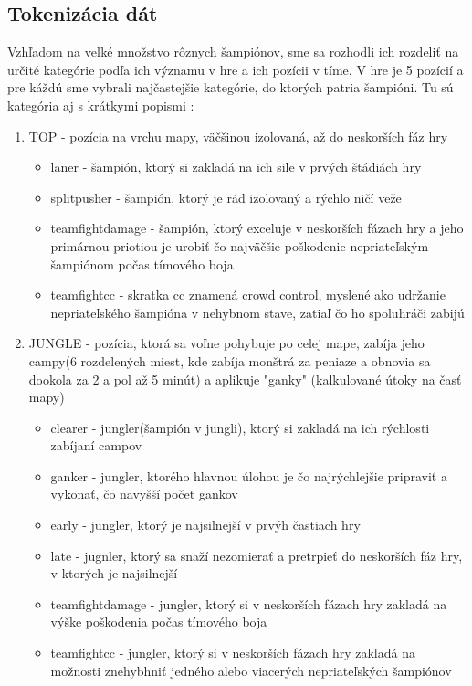 \subsection{Tokenizácia dát}
Vzhľadom na veľké množstvo rôznych šampiónov, sme sa rozhodli ich rozdeliť na určité kategórie podľa ich významu v hre a ich pozícii v tíme.
V hre je 5 pozícií a pre káždú sme vybrali najčastejšie kategórie, do ktorých patria šampióni. Tu sú kategória aj s krátkymi popismi :
\begin{enumerate}
	\item TOP - pozícia na vrchu mapy, väčšinou izolovaná, až do neskorších fáz hry
	 \begin{itemize}
		\item laner - šampión, ktorý si zakladá na ich sile v prvých štádiách hry
		\item splitpusher - šampión, ktorý je rád izolovaný a rýchlo ničí veže
		\item teamfightdamage - šampión, ktorý exceluje v neskorších fázach hry a jeho primárnou priotiou je urobiť čo najväčšie poškodenie nepriateľským šampiónom počas tímového boja
		\item teamfightcc - skratka cc znamená crowd control, myslené ako udržanie nepriateľského šampióna v nehybnom stave, zatiaľ čo ho spoluhráči zabijú
	\end{itemize}
	\item JUNGLE - pozícia, ktorá sa voľne pohybuje po celej mape, zabíja jeho campy(6 rozdelených miest, kde zabíja monštrá za peniaze a obnovia sa dookola za 2 a pol až 5 minút)  a aplikuje "ganky" (kalkulované útoky na časť mapy)
	\begin{itemize}
		\item clearer - jungler(šampión v jungli), ktorý si zakladá na ich rýchlosti zabíjaní campov
		\item ganker - jungler, ktorého hlavnou úlohou je čo najrýchlejšie pripraviť a vykonať, čo navyšší počet gankov
		\item early - jungler, ktorý je najsilnejší v prvýh častiach hry
		\item late - jugnler, ktorý sa snaží nezomierať a pretrpieť do neskorších fáz hry, v ktorých je najsilnejší
		\item teamfightdamage - jungler, ktorý si v neskorších fázach hry zakladá na výške poškodenia počas tímového boja
		\item teamfightcc - jungler, ktorý si v neskorších fázach hry zakladá na možnosti znehybhniť jedného alebo viacerých nepriateľských šampiónov

\end{itemize}
\end{enumerate}
